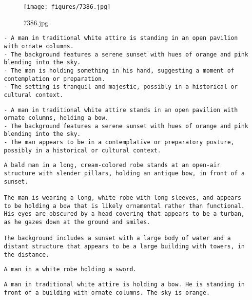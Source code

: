 \clearpage
\begin{figure}[H]
    \centering
    \texttt{[image: figures/7386.jpg]}
    \caption{7386.jpg}
    \label{fig:7386.jpg}
\end{figure}



\begin{lstlisting}[caption={Captions using Ensemble without Llama for 7386.jpg}]
- A man in traditional white attire is standing in an open pavilion with ornate columns.
- The background features a serene sunset with hues of orange and pink blending into the sky.
- The man is holding something in his hand, suggesting a moment of contemplation or preparation.
- The setting is tranquil and majestic, possibly in a historical or cultural context.
\end{lstlisting}


\begin{lstlisting}[caption={Captions using Ensemble with Llama for 7386.jpg}]
- A man in traditional white attire stands in an open pavilion with ornate columns, holding a bow.
- The background features a serene sunset with hues of orange and pink blending into the sky.
- The man appears to be in a contemplative or preparatory posture, possibly in a historical or cultural context.
\end{lstlisting}


\begin{lstlisting}[caption={Captions using Llama 3.2 for 7386.jpg}]
A bald man in a long, cream-colored robe stands at an open-air structure with slender pillars, holding an antique bow, in front of a sunset.

The man is wearing a long, white robe with long sleeves, and appears to be holding a bow that is likely ornamental rather than functional. His eyes are obscured by a head covering that appears to be a turban, as he gazes down at the ground and smiles.

The background includes a sunset with a large body of water and a distant structure that appears to be a large building with towers, in the distance.
\end{lstlisting}


\begin{lstlisting}[caption={Captions using Phi 4 for 7386.jpg}]
A man in a white robe holding a sword.
\end{lstlisting}


\begin{lstlisting}[caption={Captions using Phi 4 with SAM 2 for 7386.jpg}]
A man in traditional white attire is holding a bow. He is standing in front of a building with ornate columns. The sky is orange.
\end{lstlisting}


